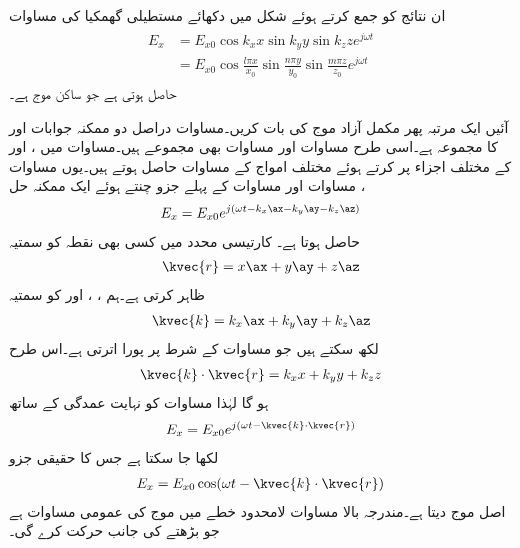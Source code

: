 ان نتائج کو جمع کرتے ہوئے  شکل  میں دکھائے مستطیلی گھمکیا کی مساوات
\begin{gather}
\begin{aligned}
E_x&=E_{x0} \cos k_x x \sin k_y y \sin k_z z e^{j \omega t}\\
&=E_{x0} \cos \frac{l \pi x }{x_0} \sin \frac{n \pi y}{y_0} \sin \frac{m \pi z}{z_0} e^{j \omega t}
\end{aligned}
\end{gather}
حاصل ہوتی ہے جو ساکن موج ہے۔


آئیں ایک مرتبہ پھر مکمل آزاد موج کی بات کریں۔مساوات  دراصل دو ممکنہ جوابات  اور  کا مجموعہ ہے۔اسی طرح مساوات   اور مساوات  بھی مجموعے ہیں۔مساوات  میں ،  اور  کے مختلف اجزاء پر کرتے ہوئے مختلف امواج کے مساوات حاصل ہوتے ہیں۔یوں مساوات ، مساوات   اور مساوات  کے پہلے جزو چنتے ہوئے ایک ممکنہ حل
\begin{align}\label{مساوات_مویج_گھمکی_عمومی_ث}
E_x=E_{x0} e^{j (\omega t -k_x \ax -k_y \ay-k_z \az)}
\end{align}
حاصل ہوتا ہے۔ کارتیسی محدد میں کسی بھی نقطہ  کو سمتیہ
\begin{align}\label{مساوات_مویج_گھمکی_عمومی_ج}
\kvec{r}=x\ax+y\ay+z\az
\end{align}
ظاہر کرتی ہے۔ہم ، ،   اور  کو سمتیہ
\begin{align}\label{مساوات_مویج_گھمکی_عمومی_چ}
\kvec{k}=k_x \ax+k_y \ay +k_z \az
\end{align}
لکھ سکتے ہیں جو مساوات  کے شرط پر پورا اترتی ہے۔اس طرح 
\begin{align}\label{مساوات_مویج_گھمکی_عمومی_ح}
\kvec{k} \cdot \kvec{r}=k_x x +k_y y +k_z z
\end{align}
ہو گا لہٰذا مساوات  کو نہایت عمدگی کے ساتھ
\begin{align}\label{مساوات_مویج_گھمکی_عمومی_خ}
E_x=E_{x0} e^{j(\omega t-\kvec{k} \cdot \kvec{r})}
\end{align}
لکھا جا سکتا ہے جس کا حقیقی جزو
\begin{align}\label{مساوات_مویج_گھمکی_عمومی_د}
E_x=E_{x0} \cos (\omega t -\kvec{k} \cdot \kvec{r})
\end{align}
اصل موج دیتا ہے۔مندرجہ بالا مساوات لامحدود خطے میں موج کی عمومی مساوات ہے جو بڑھتے  کی جانب حرکت کرے گی۔


